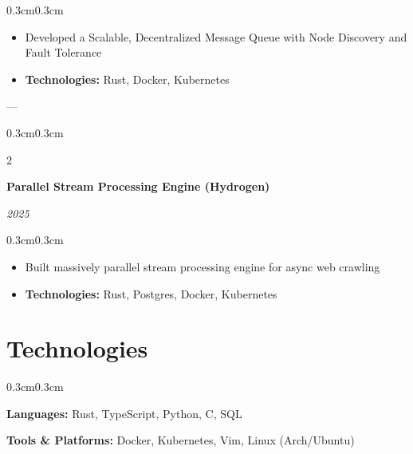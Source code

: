 \documentclass[11pt, letterpaper]{article}
\newenvironment{highlights}{
    \begin{itemize}[
        leftmargin=0.5cm,
        itemsep=0.2cm,
        parsep=0pt
    ]
}{
    \end{itemize}
}
\newenvironment{onecolentry}{
    \begin{adjustwidth}{0.3cm}{0.3cm}
}{
    \end{adjustwidth}
}
\newenvironment{twocolentry}[2][]{
    \onecolentry
    \def\secondColumn{#2}
    \setcolumnwidth{\fill, 5cm}
    \begin{paracol}{2}
}{
    \switchcolumn \raggedleft \color{dateColor}\secondColumn
    \end{paracol}
    \endonecolentry
}
\begin{document}
\begin{onecolentry}
    \begin{highlights}
        \item Developed a Scalable, Decentralized Message Queue with Node Discovery and Fault Tolerance
        \item \textbf{Technologies:} Rust, Docker, Kubernetes
    \end{highlights}
\end{onecolentry}
---
\begin{twocolentry}{\textit{2025}}
    \textbf{Parallel Stream Processing Engine (Hydrogen)}
\end{twocolentry}

\begin{onecolentry}
    \begin{highlights}
        \item Built massively parallel stream processing engine for async web crawling
        \item \textbf{Technologies:} Rust, Postgres, Docker, Kubernetes
    \end{highlights}
\end{onecolentry}

\section{Technologies}
\begin{onecolentry}
    \textbf{Languages:} Rust, TypeScript, Python, C, SQL
    
    \vspace{0.3cm}
    
    \textbf{Tools \& Platforms:} Docker, Kubernetes, Vim, Linux (Arch/Ubuntu)
\end{onecolentry}
\end{document}

